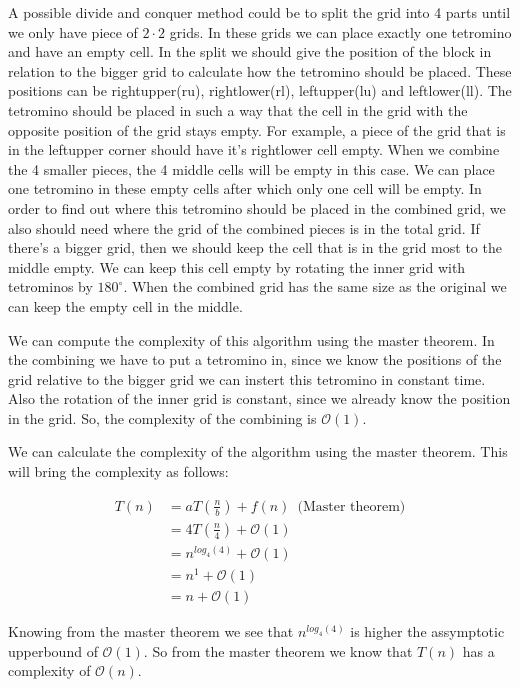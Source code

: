 \documentclass{article}
\newcommand{\bigO}{\mathcal{O}}
\begin{document}
A possible divide and conquer method could be to split the grid into 4 parts until we only have piece of $2 \cdot 2$ grids. In these grids we can place exactly one tetromino and have an empty cell. In the split we should give the position of the block in relation to the bigger grid to calculate how the tetromino should be placed. These positions can be rightupper(ru), rightlower(rl), leftupper(lu) and leftlower(ll). The tetromino should be placed in such a way that the cell in the grid with the opposite position of the grid stays empty. For example, a piece of the grid that is in the leftupper corner should have it's rightlower cell empty. When we combine the 4 smaller pieces, the 4 middle cells will be empty in this case. We can place one tetromino in these empty cells after which only one cell will be empty. In order to find out where this tetromino should be placed in the combined grid, we also should need where the grid of the combined pieces is in the total grid. If there's a bigger grid, then we should keep the cell that is in the grid most to the middle empty. We can keep this cell empty by rotating the inner grid with tetrominos by $180^\circ$. When the combined grid has the same size as the original we can keep the empty cell in the middle.

We can compute the complexity of this algorithm using the master theorem. In the combining we have to put a tetromino in, since we know the positions of the grid relative to the bigger grid we can instert this tetromino in constant time. Also the rotation of the inner grid is constant, since we already know the position in the grid. So, the complexity of the combining is $\bigO (1)$.

We can calculate the complexity of the algorithm using the master theorem. This will bring the complexity as follows:

\begin{align*}
  T(n) &= aT(\frac{n}{b}) + f(n) \enspace \text{(Master theorem)}\\
   &= 4T(\frac{n}{4}) + \bigO (1) \\
   &= n^{log_4(4)} + \bigO (1) \\
   &= n^1 + \bigO (1) \\
   &= n + \bigO (1)
\end{align*}

Knowing from the master theorem we see that $n^{log_4(4)}$ is higher the assymptotic upperbound of $\bigO (1)$. So from the master theorem we know that $T(n)$ has a complexity of $\bigO (n)$.
\end{document}

